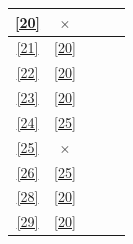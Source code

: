 \documentclass[12pt, svgnames, oneside]{book}
\begin{document}
\begin{center}
\begin{longtable}{|c|c|c|c|c|}
						\ref{20} & $\times$ & \checkmark & & \\ \hline
						\ref{21} & \ref{20} & \checkmark & & \\ \hline
						\ref{22} & \ref{20} & \checkmark & & \\ \hline
						\ref{23} & \ref{20} & \checkmark & & \\ \hline
						\ref{24} & \ref{25} & \checkmark & & \\ \hline
						\ref{25} & $\times$ & \checkmark & & \\ \hline
						\ref{26} & \ref{25} & \checkmark & & \\ \hline
						\ref{28} & \ref{20} & \checkmark & & \\ \hline
						\ref{29} & \ref{20} & \checkmark & & \\ \hline
					\end{longtable}
				\end{center}


\end{document}
